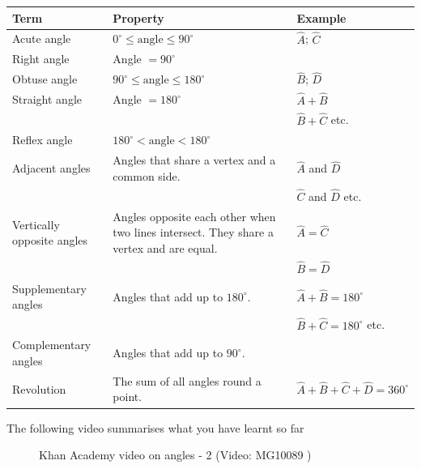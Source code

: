 \begin{table}[H]
\begin{center}
\begin{tabular}{|l|p{4cm}|l|} \hline
Term & Property & Example\\ \hline
Acute angle & $0^{\circ} \leq \mbox{angle} \leq 90^{\circ}$ & $\hat{A}$; $\hat{C}$ \\ \hline
Right angle & Angle $= 90^{\circ}$ &  \\ \hline
Obtuse angle & $90^{\circ} \leq \mbox{angle} \leq 180^{\circ}$ & $\hat{B}$; $\hat{D}$ \\ \hline
Straight angle & Angle $= 180^{\circ}$ & $\hat{A} + \hat{B}$  \\
& & $\hat{B} + \hat{C}$ etc.  \\ \hline
Reflex angle & $180^{\circ} < \mbox{angle} < 180^{\circ}$ &  \\ \hline
Adjacent angles & Angles that share a vertex and a common side. & $\hat{A}$ and $\hat{D}$ \\ 
& & $\hat{C}$ and $\hat{D}$ etc. \\ \hline
Vertically opposite angles & Angles opposite each other when two lines intersect. They share a vertex and are equal. & $\hat{A}=\hat{C}$\\
 &  & $\hat{B}=\hat{D}$\\ \hline
Supplementary angles & Angles that add up to $180^{\circ}$. & $\hat{A}+\hat{B}=180^{\circ}$\\ \hline
& & $\hat{B}+\hat{C}=180^{\circ}$ etc. \\ \hline
Complementary angles & Angles that add up to $90^{\circ}$. & \\ \hline
Revolution & The sum of all angles round a point. &  $\hat{A}+\hat{B}+\hat{C}+\hat{D}=360^{\circ}$ \\ \hline

\end{tabular}
\end{center}
\end{table}
\par

The following video summarises what you have learnt so far
\setcounter{subfigure}{0}
\begin{figure}[H] %
\textnormal{Khan Academy video on angles - 2}\vspace{.1in} \nopagebreak
\label{m39370*yt-media2}\label{m39370*yt-video2}
{ (Video:  MG10089 )}
\vspace{2pt}
\vspace{.1in}
\end{figure}       \par 

